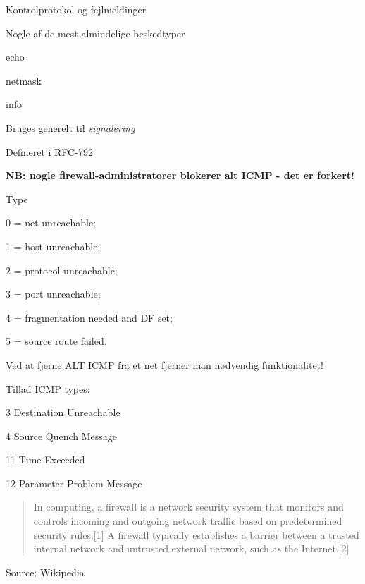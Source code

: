 \documentclass[Screen16to9,17pt]{foils}
\begin{document}

\begin{list1}
\item Kontrolprotokol og fejlmeldinger
\item Nogle af de mest almindelige beskedtyper
\begin{list2}
\item echo
\item netmask
\item info
\end{list2}
\item Bruges generelt til \emph{signalering}
\item Defineret i RFC-792
\end{list1}

\centerline{\bf NB: nogle firewall-administratorer blokerer alt ICMP - det er forkert!}


\begin{list1}
\item Type
\begin{list2}
\item 0 = net unreachable;
\item 1 = host unreachable;
\item 2 = protocol unreachable;
\item 3 = port unreachable;
\item 4 = fragmentation needed and DF set;
\item 5 = source route failed.
\end{list2}
\item Ved at fjerne ALT ICMP fra et net fjerner man nødvendig funktionalitet!
\item Tillad ICMP types:
\begin{list2}
\item 3 Destination Unreachable
\item 4 Source Quench Message
\item 11 Time Exceeded
\item 12 Parameter Problem Message
\end{list2}
\end{list1}



\begin{quote}
In computing, a firewall is a network security system that monitors and controls incoming and outgoing network traffic based on predetermined security rules.[1] A firewall typically establishes a barrier between a trusted internal network and untrusted external network, such as the Internet.[2]
\end{quote} Source: Wikipedia
\end{document}
